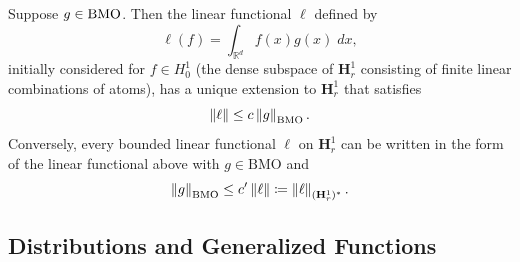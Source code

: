 \documentclass{article}
\begin{document}
\begin{theorem}
	Suppose $g \in \textup{BMO}$. Then the linear functional $\ell$ defined by 
	\begin{equation*}
		\ell(f) = \int_{\mathbb{R}^{d}}f(x)g(x)\;dx, 
	\end{equation*} 
	initially considered for $f \in H_{0}^{1}$ (the dense subspace of $\mathbf{H}^{1}_{r}$ consisting of finite linear combinations of atoms), has a unique extension to $\mathbf{H}^{1}_{r}$ that satisfies 
	\begin{equation*}
		\left\Vert \ell \right\Vert \leq c\left\Vert g \right\Vert_{\textup{BMO}}. 
	\end{equation*} 
	Conversely, every bounded linear functional $\ell$ on $\mathbf{H}^{1}_{r}$ can be written in the form of the linear functional above with $g \in \text{BMO}$ and 
	\begin{equation*}
		\left\Vert g \right\Vert_{\text{BMO}} \leq c'\left\Vert \ell \right\Vert \coloneqq \left\Vert \ell \right\Vert_{(\mathbf{H}^{1}_{r})^{\ast}}. 
	\end{equation*}
\end{theorem} 
\newpage 

\subsection{Distributions and Generalized Functions} \label{subsec:distributions}
\end{document}
